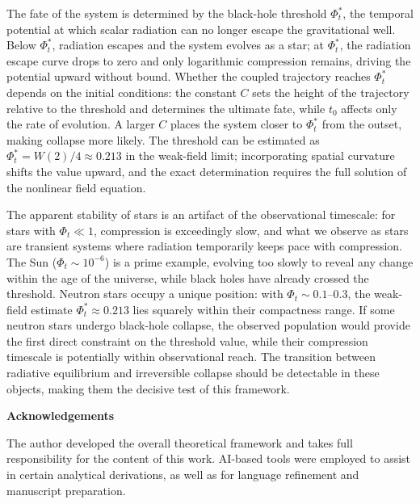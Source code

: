 \documentclass[12pt]{article}
\begin{document}
The fate of the system is determined by the black-hole threshold $\Phi_t^*$, the temporal potential at which scalar radiation can no longer escape the gravitational well. Below $\Phi_t^*$, radiation escapes and the system evolves as a star; at $\Phi_t^*$, the radiation escape curve drops to zero and only logarithmic compression remains, driving the potential upward without bound. Whether the coupled trajectory reaches $\Phi_t^*$ depends on the initial conditions: the constant $C$ sets the height of the trajectory relative to the threshold and determines the ultimate fate, while $t_0$ affects only the rate of evolution. A larger $C$ places the system closer to $\Phi_t^*$ from the outset, making collapse more likely. The threshold can be estimated as $\Phi_t^* = W(2)/4 \approx 0.213$ in the weak-field limit; incorporating spatial curvature shifts the value upward, and the exact determination requires the full solution of the nonlinear field equation.

The apparent stability of stars is an artifact of the observational timescale: for stars with $\Phi_t \ll 1$, compression is exceedingly slow, and what we observe as stars are transient systems where radiation temporarily keeps pace with compression. The Sun ($\Phi_t \sim 10^{-6}$) is a prime example, evolving too slowly to reveal any change within the age of the universe, while black holes have already crossed the threshold. Neutron stars occupy a unique position: with $\Phi_t \sim 0.1$--$0.3$, the weak-field estimate $\Phi_t^* \approx 0.213$ lies squarely within their compactness range. If some neutron stars undergo black-hole collapse, the observed population would provide the first direct constraint on the threshold value, while their compression timescale is potentially within observational reach. The transition between radiative equilibrium and irreversible collapse should be detectable in these objects, making them the decisive test of this framework.


\vspace{1em}
\noindent\textbf{Acknowledgements}

\vspace{0.5em}
\noindent The author developed the overall theoretical framework and takes full responsibility for the content of this work. AI-based tools were employed to assist in certain analytical derivations, as well as for language refinement and manuscript preparation.
\end{document}

